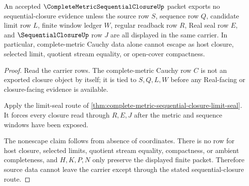 \begin{theorem}
\label{thm:complete-metric-sequential-closure-source-nonescape}
An accepted $\CompleteMetricSequentialClosureUp$ packet exports no sequential-closure evidence unless the source row $S$, sequence row $Q$, candidate limit row $L$, finite window ledger $W$, regular readback row $R$, Real seal row $E$, and $\SequentialClosureUp$ row $J$ are all displayed in the same carrier. In particular, complete-metric Cauchy data alone cannot escape as host closure, selected limit, quotient stream equality, or open-cover compactness.
\end{theorem}
\begin{proof}
Read the carrier rows. The complete-metric Cauchy row $C$ is not an exported closure object by itself; it is tied to $S,Q,L,W$ before any Real-facing or closure-facing evidence is available.

Apply the limit-seal route of \autoref{thm:complete-metric-sequential-closure-limit-seal}. It forces every closure read through $R,E,J$ after the metric and sequence windows have been exposed.

The nonescape claim follows from absence of coordinates. There is no row for host closure, selected limits, quotient stream equality, compactness, or ambient completeness, and $H,K,P,N$ only preserve the displayed finite packet. Therefore source data cannot leave the carrier except through the stated sequential-closure route.
\end{proof}




